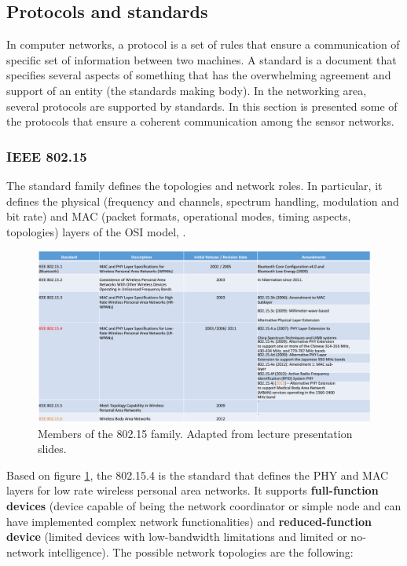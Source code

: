 \subsection{Protocols and standards}
\label{subs:333}
In computer networks, a protocol is a set of rules that ensure a communication of specific set of information between two machines. A standard is a document that specifies several aspects of something that has the overwhelming agreement and support of an entity (the standards making body). In the networking area, several protocols are supported by standards. In this section is presented some of the protocols that ensure a coherent communication among the sensor networks.

\subsubsection{IEEE 802.15}

The standard family defines the topologies and network roles. In particular, it defines the physical (frequency and channels, spectrum handling, modulation and bit rate) and \ac{MAC} (packet formats, operational modes, timing aspects, topologies) layers of the \ac{OSI} model, \cite{Hackmann2006}.


\begin{figure}[h!]
	\centering
	\includegraphics[width=1.05\textwidth,keepaspectratio]{figures/33.WirelessN/nancy2014}
	\caption{Members of the 802.15 family. Adapted from \cite{nancy2014} lecture presentation slides.}
	\label{fig:nancy2014}
\end{figure}

Based on figure \ref{fig:nancy2014}, the 802.15.4 is the standard that defines the \ac{PHY} and \ac{MAC} layers for low rate wireless personal area networks. It supports \textbf{full-function devices} (device capable of being the network coordinator or simple node and can have implemented complex network functionalities) and \textbf{reduced-function device} (limited devices with low-bandwidth limitations and limited or no-network intelligence). The possible network topologies are the following:

